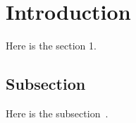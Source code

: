 \section{Introduction}

Here is the section 1.

\subsection{Subsection}

Here is the subsection~\cite{randall1998cilk}.